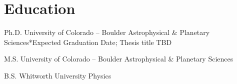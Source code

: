 \section{Education}

        {Ph.D.}
        {University of Colorado -- Boulder}
        {Astrophysical \& Planetary Sciences}{}{*Expected Graduation Date; Thesis title TBD}

        {M.S.}
        {University of Colorado -- Boulder}
        {Astrophysical \& Planetary Sciences}{}{}

        {B.S.}
        {Whitworth University}
        {Physics}{}{}
